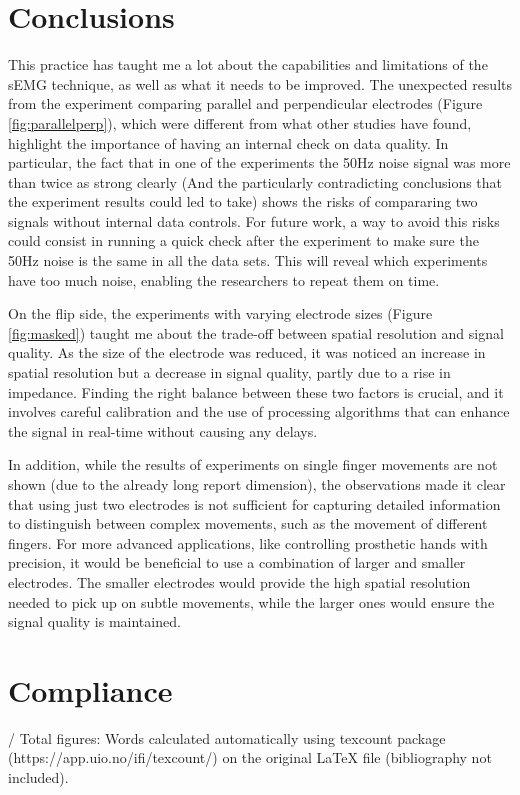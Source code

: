 \documentclass[conference]{IEEEtran}
\newcommand\wordcount{
   \immediate\write18{wordcount.bat \jobname.tex}
   
}
\newcounter{totalfigures}
\begin{document}
\section{Conclusions}

This practice has taught me a lot about the capabilities and limitations of the sEMG technique, 
as well as what it needs to be improved. The unexpected results from the experiment comparing parallel and 
perpendicular electrodes (Figure \ref{fig:parallelperp}), which were different from what other studies have found, highlight the 
importance of having an internal check on data quality. In particular, the fact that in one of the experiments 
the 50Hz noise signal was more than twice as strong clearly (And the particularly contradicting conclusions that the experiment results could led to take) 
shows the risks of compararing two signals without internal data controls. For future work, a way to avoid this risks could consist in running a quick 
check after the experiment to make sure the 50Hz noise is the same in all the data sets. This will reveal which experiments have too much 
noise, enabling the researchers to repeat them on time.

On the flip side, the experiments with varying electrode sizes (Figure \ref{fig:masked}) taught me about the trade-off between 
spatial resolution and signal quality. As the size of the electrode was reduced, it was noticed an increase 
in spatial resolution but a decrease in signal quality, partly due to a rise in impedance. Finding the right 
balance between these two factors is crucial, and it involves careful calibration and the use of processing 
algorithms that can enhance the signal in real-time without causing any delays.

In addition, while the results of experiments on single finger movements are not shown (due to 
the already long report dimension), the observations made it clear that using just two electrodes is not sufficient for 
capturing detailed information to distinguish between complex movements, such as the movement of different
 fingers. For more advanced applications, like controlling prosthetic hands with precision, it would be 
 beneficial to use a combination of larger and smaller electrodes. The smaller electrodes would provide the 
 high spatial resolution needed to pick up on subtle movements, while the larger ones would ensure the signal
  quality is maintained.



\vspace{2cm}
\section{Compliance}
\wordcount / Total figures: \thetotalfigures\vspace{0.2cm}
\break
\small{Words calculated automatically using texcount package (https://app.uio.no/ifi/texcount/) on the original LaTeX file (bibliography not included).}
\end{document}
